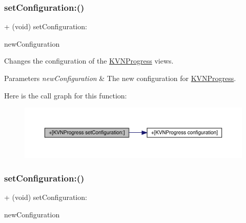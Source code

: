 \subsubsection{\texorpdfstring{set\+Configuration\+:()}{setConfiguration:()}\hspace{0.1cm}{\footnotesize\ttfamily [1/3]}}
{\footnotesize\ttfamily + (void) set\+Configuration\+: \begin{DoxyParamCaption}\item[{(\mbox{\hyperlink{interface_k_v_n_progress_configuration}{K\+V\+N\+Progress\+Configuration}} $\ast$)}]{new\+Configuration }\end{DoxyParamCaption}}

Changes the configuration of the {\ttfamily \mbox{\hyperlink{interface_k_v_n_progress}{K\+V\+N\+Progress}}} views. 
\begin{DoxyParams}{Parameters}
{\em new\+Configuration} & The new configuration for {\ttfamily \mbox{\hyperlink{interface_k_v_n_progress}{K\+V\+N\+Progress}}}. \\
\hline
\end{DoxyParams}
Here is the call graph for this function\+:\nopagebreak
\begin{figure}[H]
\begin{center}
\leavevmode
\includegraphics[width=350pt]{interface_k_v_n_progress_ab00ed30bcc9ef7e6517f27554d570bf9_cgraph}
\end{center}
\end{figure}
\mbox{\label{interface_k_v_n_progress_ab00ed30bcc9ef7e6517f27554d570bf9}} 
\subsubsection{\texorpdfstring{set\+Configuration\+:()}{setConfiguration:()}\hspace{0.1cm}{\footnotesize\ttfamily [2/3]}}
{\footnotesize\ttfamily + (void) set\+Configuration\+: \begin{DoxyParamCaption}\item[{(\mbox{\hyperlink{interface_k_v_n_progress_configuration}{K\+V\+N\+Progress\+Configuration}} $\ast$)}]{new\+Configuration }\end{DoxyParamCaption}}

